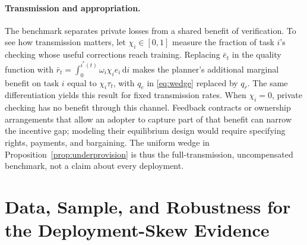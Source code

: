 \documentclass[12pt]{article}
\theoremstyle{plain}
\theoremstyle{definition}
\theoremstyle{remark}
\begin{document}
\paragraph{Transmission and appropriation.}
The benchmark separates private losses from a shared benefit of
verification. To see how transmission matters, let $\chi_i\in[0,1]$
measure the fraction of task $i$'s checking whose useful corrections
reach training. Replacing $\bar e_t$ in the quality function with
$\bar r_t=\int_0^{i^*(t)}\omega_i\chi_i e_i\,\mathrm{d}i$ makes the
planner's additional marginal benefit on task $i$ equal to
$\chi_i\tau_t$, with $q_e$ in \eqref{eq:wedge} replaced by $q_r$.
The same differentiation yields this result for fixed transmission
rates. When $\chi_i=0$, private checking has no benefit through this
channel. Feedback contracts or ownership arrangements that allow an
adopter to capture part of that benefit can narrow the incentive gap;
modeling their equilibrium design would require specifying rights,
payments, and bargaining. The uniform wedge in
Proposition~\ref{prop:underprovision} is thus the full-transmission,
uncompensated benchmark, not a claim about every deployment.

\section{Data, Sample, and Robustness for the Deployment-Skew Evidence}\label{app:evidence}
\end{document}
